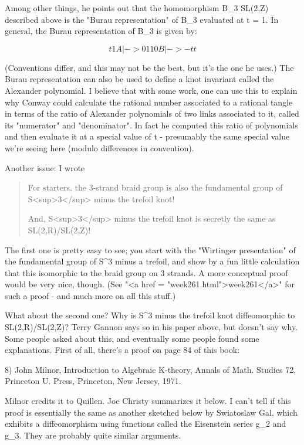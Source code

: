 Among other things, he points out that the homomorphism
B_{3} \to  SL(2,Z) described above is the "Burau
representation" of B_{3} evaluated at t = 1.
In general, the Burau representation of B_{3} is given 
by:

$$
        t   1
A |->  
        0   1


        1   0
B |->  
       -t   t
$$
    
(Conventions differ, and this may not be the best, but it's
the one he uses.)  The Burau representation can also be used
to define a knot invariant called the Alexander polynomial.  
I believe that with some work, one can use this to explain
why Conway could calculate the rational number associated to a
rational tangle in terms of the ratio of Alexander polynomials of two
links associated to it, called its "numerator" and
"denominator".  In fact he computed this ratio of
polynomials and then evaluate it at a special value of t - 
presumably the same special value we're seeing here (modulo
differences in convention).

Another issue: I wrote

\begin{quote}
For starters, the 3-strand braid group is also the fundamental group of 
S<sup>3</sup> minus the trefoil knot!

And, S<sup>3</sup> minus the trefoil knot is secretly the same as
SL(2,R)/SL(2,Z)!
\end{quote}
    

The first one is pretty easy to see; you start with the "Wirtinger 
presentation" of the fundamental group of S^{3} minus a 
trefoil, and show by a fun little calculation that this isomorphic to the 
braid group on 3 strands.  A more conceptual proof would be very nice, though.
(See "<a href = "week261.html">week261</a>" for such a proof -
and much more on all this stuff.)

What about the second one?  Why is  S^{3} minus the trefoil knot 
diffeomorphic
to SL(2,R)/SL(2,Z)?   Terry Gannon says so in his paper above, but doesn't
say why.  Some people asked about this, and eventually some people found
some explanations.  First of all, there's a proof on page 84 of this book:

8) John Milnor, Introduction to Algebraic K-theory, Annals of Math.
Studies 72, Princeton U. Press, Princeton, New Jersey, 1971.

Milnor credits it to Quillen.  Joe Christy summarizes it below.  I
can't tell if this proof is essentially the same as another sketched
below by Swiatoslaw Gal, which exhibits a diffeomorphism using
functions called the Eisenstein series g_{2} and
g_{3}.  They are probably quite similar arguments.

